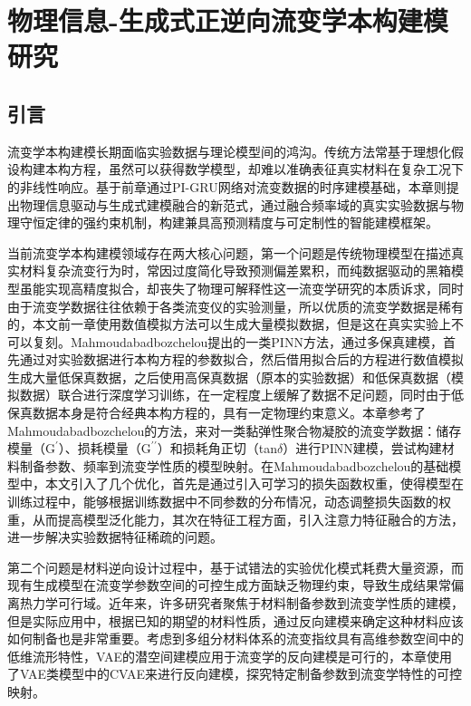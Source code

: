 \chapter{物理信息-生成式正逆向流变学本构建模研究}
\section{引言}
流变学本构建模长期面临实验数据与理论模型间的鸿沟。传统方法常基于理想化假设构建本构方程，虽然可以获得数学模型，却难以准确表征真实材料在复杂工况下的非线性响应。基于前章通过PI-GRU网络对流变数据的时序建模基础，本章则提出物理信息驱动与生成式建模融合的新范式，通过融合频率域的真实实验数据与物理守恒定律的强约束机制，构建兼具高预测精度与可定制性的智能建模框架。

当前流变学本构建模领域存在两大核心问题，第一个问题是传统物理模型在描述真实材料复杂流变行为时，常因过度简化导致预测偏差累积，而纯数据驱动的黑箱模型虽能实现高精度拟合，却丧失了物理可解释性这一流变学研究的本质诉求，同时由于流变学数据往往依赖于各类流变仪的实验测量，所以优质的流变学数据是稀有的，本文前一章使用数值模拟方法可以生成大量模拟数据，但是这在真实实验上不可以复刻。Mahmoudabadbozchelou提出的一类PINN方法，通过多保真建模，首先通过对实验数据进行本构方程的参数拟合，然后借用拟合后的方程进行数值模拟生成大量低保真数据，之后使用高保真数据（原本的实验数据）和低保真数据（模拟数据）联合进行深度学习训练，在一定程度上缓解了数据不足问题，同时由于低保真数据本身是符合经典本构方程的，具有一定物理约束意义。本章参考了Mahmoudabadbozchelou的方法，来对一类黏弹性聚合物凝胶的流变学数据：储存模量（$\mathrm{G^{\prime}}$）、损耗模量（$\mathrm{G^{\prime\prime}}$）和损耗角正切（tan$\delta$）进行PINN建模，尝试构建材料制备参数、频率到流变学性质的模型映射。在Mahmoudabadbozchelou的基础模型中，本文引入了几个优化，首先是通过引入可学习的损失函数权重，使得模型在训练过程中，能够根据训练数据中不同参数的分布情况，动态调整损失函数的权重，从而提高模型泛化能力，其次在特征工程方面，引入注意力特征融合的方法，进一步解决实验数据特征稀疏的问题。

第二个问题是材料逆向设计过程中，基于试错法的实验优化模式耗费大量资源，而现有生成模型在流变学参数空间的可控生成方面缺乏物理约束，导致生成结果常偏离热力学可行域。近年来，许多研究者聚焦于材料制备参数到流变学性质的建模，但是实际应用中，根据已知的期望的材料性质，通过反向建模来确定这种材料应该如何制备也是非常重要。考虑到多组分材料体系的流变指纹具有高维参数空间中的低维流形特性，VAE的潜空间建模应用于流变学的反向建模是可行的，本章使用了VAE类模型中的CVAE来进行反向建模，探究特定制备参数到流变学特性的可控映射。

